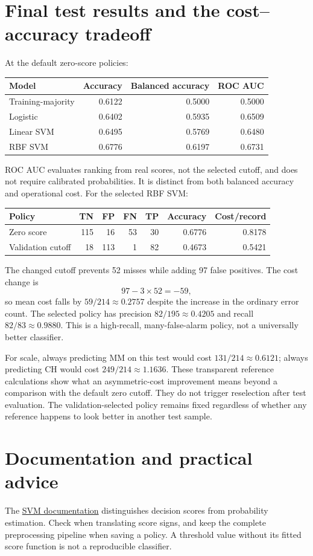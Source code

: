 \section{Final test results and the cost--accuracy tradeoff}
At the default zero-score policies:
\begin{center}\begin{tabular}{lrrr}\toprule
Model&Accuracy&Balanced accuracy&ROC AUC\\\midrule
Training-majority&0.6122&0.5000&0.5000\\
Logistic&0.6402&0.5935&0.6509\\
Linear SVM&0.6495&0.5769&0.6480\\
RBF SVM&0.6776&0.6197&0.6731\\\bottomrule\end{tabular}\end{center}
ROC AUC evaluates ranking from real scores, not the selected cutoff, and does not require calibrated probabilities.
It is distinct from both balanced accuracy and operational cost.
For the selected RBF SVM:
\begin{center}\begin{tabular}{lrrrrrr}\toprule
Policy&TN&FP&FN&TP&Accuracy&Cost/record\\\midrule
Zero score&115&16&53&30&0.6776&0.8178\\
Validation cutoff&18&113&1&82&0.4673&0.5421\\\bottomrule\end{tabular}\end{center}
The changed cutoff prevents 52 misses while adding 97 false positives. The cost change is
\[97-3\times52=-59,\]
so mean cost falls by $59/214\approx0.2757$ despite the increase in the ordinary error count.
The selected policy has precision $82/195\approx0.4205$ and recall $82/83\approx0.9880$.
This is a high-recall, many-false-alarm policy, not a universally better classifier.

For scale, always predicting MM on this test would cost $131/214\approx0.6121$;
always predicting CH would cost $249/214\approx1.1636$. These transparent reference calculations show what
an asymmetric-cost improvement means beyond a comparison with the default zero cutoff.
They do not trigger reselection after test evaluation. The validation-selected policy remains fixed regardless
of whether any reference happens to look better in another test sample.

\section*{Documentation and practical advice}
The \href{https://scikit-learn.org/1.8/modules/svm.html}{SVM documentation} distinguishes decision scores from
probability estimation. Check  when translating score signs, and keep the complete preprocessing
pipeline when saving a policy. A threshold value without its fitted score function is not a reproducible classifier.

